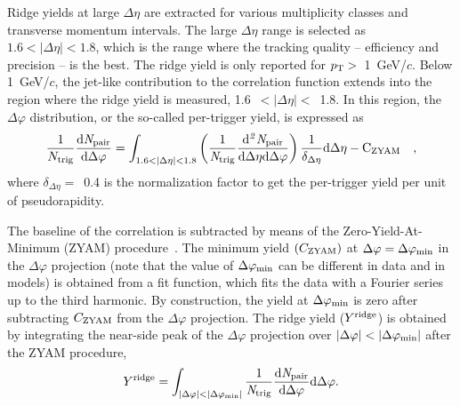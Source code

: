 Ridge yields at large $\Delta\eta$ are extracted for various multiplicity classes and transverse momentum intervals. The large $\Delta\eta$ range is selected as $1.6<|\Delta\eta|<1.8$, which is the range where the tracking quality -- efficiency and precision -- is the best. The ridge yield is only reported for $p_\mathrm{T}>$~1~GeV/$c$. Below 1~GeV/$c$, the jet-like contribution to the correlation function extends into the region where the ridge yield is measured, 1.6~$<|\Delta\eta|<$~1.8. In this region, the $\Delta\varphi$ distribution, or the so-called per-trigger yield, is expressed as
\begin{eqnarray}
\frac{1}{N_{\rm{trig}}} \frac{ \rm{d}\it{}N_{\rm{pair}} }{ \rm{d}\Delta\varphi } = \int_{1.6<|\Delta \eta|<1.8} \left( \frac{1}{\it{N}_{\rm{trig}}} \frac{ \rm{d}\it{}^{2} N_{\rm{pair}} }{ \rm{d}\Delta\eta d\Delta\varphi} \right) \dfrac{1}{\delta_{\Delta\eta}} \rm{d}\Delta \eta - C_{\rm{ZYAM}}\quad ,
\end{eqnarray}
where $\delta_{\Delta\eta}=$~0.4 is the normalization factor to get the per-trigger yield per unit of pseudorapidity. 

The baseline of the correlation is subtracted by means of the Zero-Yield-At-Minimum (ZYAM) procedure~\cite{Ajitanand:2005jj}. The minimum yield $(C_{\rm{ZYAM}})$ at $\Delta\varphi=\Delta\varphi_{\rm{min}}$ in the $\Delta\varphi$ projection (note that the value of $\Delta\varphi_{\rm{min}}$ can be different in data and in models) is obtained from a fit function, which fits the data with a Fourier series up to the third harmonic. By construction, the yield at $\Delta\varphi_{\rm{min}}$ is zero after subtracting $C_{\rm{ZYAM}}$ from the $\Delta\varphi$ projection. The ridge yield ($Y^{\rm{ridge}}$) is obtained by integrating the near-side peak of the $\Delta\varphi$ projection over $|\Delta\varphi|<|\Delta\varphi_{\rm{min}}|$ after the ZYAM procedure,
\begin{eqnarray}
Y^{\rm{ridge}} = \int_{|\Delta \varphi| < |\Delta\varphi_{\rm{min}}| } \frac{1}{\it{N}_{\rm{trig}}} \frac{ \rm{d}\it{}N_{\rm{pair}} }{ \rm{d}\Delta\varphi }  \rm{d} \Delta\varphi .
\end{eqnarray}

